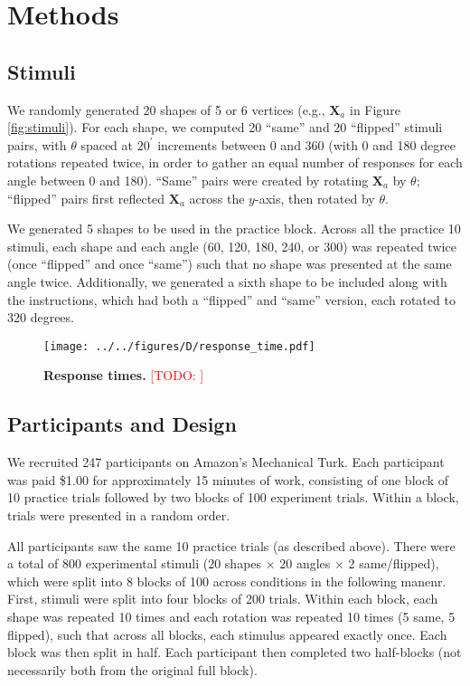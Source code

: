 \documentclass[10pt,letterpaper]{article}
\newcommand{\TODO}[1]{\textcolor{red}{[TODO: #1]}}
\newcommand{\Xa}[0]{\mathbf{X}_a}
\begin{document}
\section{Methods}


\subsection{Stimuli}

We randomly generated 20 shapes of 5 or 6 vertices (e.g., $\Xa$ in
Figure \ref{fig:stimuli}). For each shape, we computed 20 ``same'' and
20 ``flipped'' stimuli pairs, with $\theta$ spaced at $20^\prime$
increments between 0 and 360 (with 0 and 180 degree rotations repeated
twice, in order to gather an equal number of responses for each angle
between 0 and 180). ``Same'' pairs were created by rotating $\Xa$ by
$\theta$; ``flipped'' pairs first reflected $\Xa$ across the $y$-axis,
then rotated by $\theta$.

We generated 5 shapes to be used in the practice block. Across all the
practice 10 stimuli, each shape and each angle (60, 120, 180, 240, or
300) was repeated twice (once ``flipped'' and once ``same'') such that
no shape was presented at the same angle twice. Additionally, we
generated a sixth shape to be included along with the instructions,
which had both a ``flipped'' and ``same'' version, each rotated to 320
degrees.

\begin{figure*}[t]
  \begin{center}
    \texttt{[image: ../../figures/D/response\_time.pdf]}
    \caption{\textbf{Response times.} \TODO{}}
    \label{fig:response-times}
  \end{center}
\end{figure*}


\subsection{Participants and Design}

We recruited 247 participants on Amazon's Mechanical Turk. Each
participant was paid \$1.00 for approximately 15 minutes of work,
consisting of one block of 10 practice trials followed by two blocks
of 100 experiment trials. Within a block, trials were presented in a
random order.

All participants saw the same 10 practice trials (as described
above). There were a total of 800 experimental stimuli (20 shapes
$\times$ 20 angles $\times$ 2 same/flipped), which were split into 8
blocks of 100 across conditions in the following manenr. First,
stimuli were split into four blocks of 200 trials. Within each block,
each shape was repeated 10 times and each rotation was repeated 10
times (5 same, 5 flipped), such that across all blocks, each stimulus
appeared exactly once. Each block was then split in half. Each
participant then completed two half-blocks (not necessarily both from
the original full block).
\end{document}
